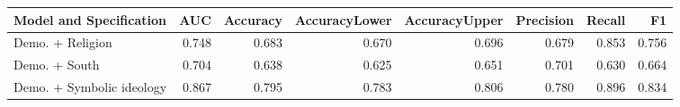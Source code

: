 \begin{table}[H]
\centering
\begin{tabular}{lrrrrrrr}
  \toprule
Model and Specification & AUC & Accuracy & AccuracyLower & AccuracyUpper & Precision & Recall & F1 \\ 
  \midrule
Demo. + Religion & 0.748 & 0.683 & 0.670 & 0.696 & 0.679 & 0.853 & 0.756 \\ 
  Demo. + South & 0.704 & 0.638 & 0.625 & 0.651 & 0.701 & 0.630 & 0.664 \\ 
  Demo. + Symbolic ideology & 0.867 & 0.795 & 0.783 & 0.806 & 0.780 & 0.896 & 0.834 \\ 
   \bottomrule
\end{tabular}
\end{table}

